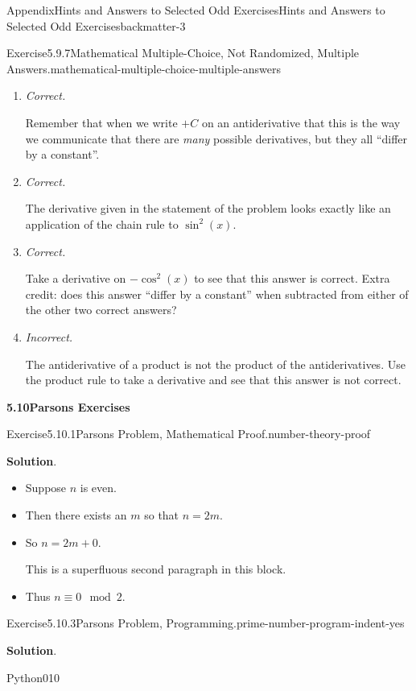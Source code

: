 \documentclass[oneside,10pt,]{book}
\newcommand{\blocktitlefont}{\relax}
\newcommand{\lititle}[1]{{\slshape#1}}
\numberwithin{equation}{section}
\begin{document}
\begin{solutions-chapter}{Appendix}{Hints and Answers to Selected Odd Exercises}{}{Hints and Answers to Selected Odd Exercises}{}{}{backmatter-3}
\begin{divisionsolution}{Exercise}{5.9.7}{Mathematical Multiple-Choice, Not Randomized, Multiple Answers.}{mathematical-multiple-choice-multiple-answers}
\begin{enumerate}[label={\Alph*.}]
\item{}\lititle{Correct.}\par%
Remember that when we write \(+C\) on an antiderivative that this is the way we communicate that there are \emph{many} possible derivatives, but they all ``differ by a constant''.%
\item{}\lititle{Correct.}\par%
The derivative given in the statement of the problem looks exactly like an application of the chain rule to \(\sin^2(x)\).%
\item{}\lititle{Correct.}\par%
Take a derivative on \(-\cos^2(x)\) to see that this answer is correct.  Extra credit: does this answer ``differ by a constant'' when subtracted from either of the other two correct answers?%
\item{}\lititle{Incorrect.}\par%
The antiderivative of a product is not the product of the antiderivatives.  Use the product rule to take a derivative and see that this answer is not correct.%
\end{enumerate}
%
\end{divisionsolution}%
\par\medskip
\noindent\textbf{\Large{}5.10\space\textperiodcentered\space{}Parsons Exercises}
\begin{divisionsolution}{Exercise}{5.10.1}{Parsons Problem, Mathematical Proof.}{number-theory-proof}%
\par\smallskip%
\noindent\textbf{\blocktitlefont Solution}.\hypertarget{number-theory-proof-4-back}{}\quad{}%
\begin{itemize}[label=\textbullet]
\item{}Suppose \(n\) is even.%
\item{}Then there exists an \(m\) so that \(n = 2m\).%
\item{}So \(n = 2m + 0\).%
\par
This is a superfluous second paragraph in this block.%
\item{}Thus \(n\equiv 0\mod 2\).%
\end{itemize}
%
\end{divisionsolution}%
\begin{divisionsolution}{Exercise}{5.10.3}{Parsons Problem, Programming.}{prime-number-program-indent-yes}%
\par\smallskip%
\noindent\textbf{\blocktitlefont Solution}.\hypertarget{prime-number-program-indent-yes-5-back}{}\quad{}\begin{program}{Python}{0}{1}{0}

\end{program}
\end{divisionsolution}
\end{solutions-chapter}
\end{document}

